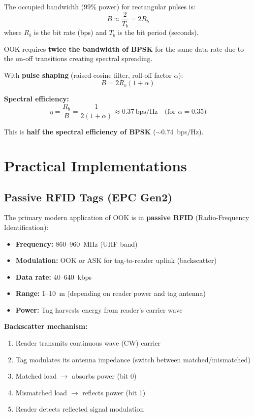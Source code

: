 The occupied bandwidth (99\% power) for rectangular pulses is:
\begin{equation}
B \approx \frac{2}{T_b} = 2R_b
\end{equation}
where $R_b$ is the bit rate (bps) and $T_b$ is the bit period (seconds).

OOK requires \textbf{twice the bandwidth of BPSK} for the same data rate due to the on-off transitions creating spectral spreading.

With \textbf{pulse shaping} (raised-cosine filter, roll-off factor $\alpha$):
\begin{equation}
B = 2R_b(1 + \alpha)
\end{equation}

\textbf{Spectral efficiency:}
\begin{equation}
\eta = \frac{R_b}{B} = \frac{1}{2(1+\alpha)} \approx 0.37\ \text{bps/Hz} \quad \text{(for $\alpha = 0.35$)}
\end{equation}

This is \textbf{half the spectral efficiency of BPSK} ($\sim$0.74~bps/Hz).

\section{Practical Implementations}

\subsection{Passive RFID Tags (EPC Gen2)}

The primary modern application of OOK is in \textbf{passive RFID} (Radio-Frequency Identification):

\begin{itemize}
\item \textbf{Frequency:} 860--960~MHz (UHF band)
\item \textbf{Modulation:} OOK or ASK for tag-to-reader uplink (backscatter)
\item \textbf{Data rate:} 40--640~kbps
\item \textbf{Range:} 1--10~m (depending on reader power and tag antenna)
\item \textbf{Power:} Tag harvests energy from reader's carrier wave
\end{itemize}

\textbf{Backscatter mechanism:}
\begin{enumerate}
\item Reader transmits continuous wave (CW) carrier
\item Tag modulates its antenna impedance (switch between matched/mismatched)
\item Matched load $\rightarrow$ absorbs power (bit 0)
\item Mismatched load $\rightarrow$ reflects power (bit 1)
\item Reader detects reflected signal modulation
\end{enumerate}

